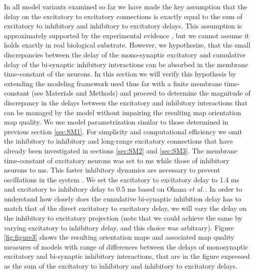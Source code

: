 \documentclass[a4paper,10pt]{article}
\newcommand{\etal}{\textit{et al.}}
\begin{document}
In all model variants examined so far we have made the key assumption that the delay on the excitatory to excitatory connections is exactly equal 
to the sum of excitatory to inhibitory and inhibitory to excitatory delays. This assumption is approximately supported by the experimental evidence \cite{Ohana2012}, but we cannot assume it holds exactly in real biological substrate.  However, we hypothesize, that the small discrepancies between the delay of the mono-synaptic excitatory and cumulative delay of the bi-synaptic inhibitory interactions can be absorbed in the membrane time-constant of the neurons. In this section we will verify this hypothesis by extending the modeling framework used thus far with a finite membrane time-constant (see Materials and Methods) and proceed to determine the magnitude of discrepancy in the delays between the excitatory and inhibitory interactions that can be managed by the model without impairing the resulting map orientation map quality. We use model parametrization similar to those determined in previous section \ref{sec:SM1}. For simplicity and computational efficiency we omit the inhibitory to inhibitory and long-range excitatory connections that have already been investigated in sections \ref{sec:SM2} and \ref{sec:SM3}. The membrane time-constant of excitatory neurons was set to ms while those of inhibitory neurons to ms. This faster inhibitory dynamics are necessary to prevent oscillations in the system \cite{Kang2003}. We set the excitatory to excitatory delay to 1.4 ms and excitatory to inhibitory delay to 0.5 ms based on Ohana \etal\,\cite{Ohana2012}. In order to understand how closely does the 
cumulative bi-synaptic inhibition delay has to match that of the direct excitatory to excitatory delay, we will vary the delay on the inhibitory to excitatory projection (note that we could achieve the same by varying excitatory
to inhibitory delay, and this choice was arbitrary). Figure \ref{fig:figure3} shows the resulting orientation maps and associated map quality measures of models with range of differences between the delays of monosynaptic excitatory and bi-synaptic inhibitory interactions, that are in the figure expressed as the sum of the excitatory to inhibitory and inhibitory to excitatory delays. 
 
\end{document}
